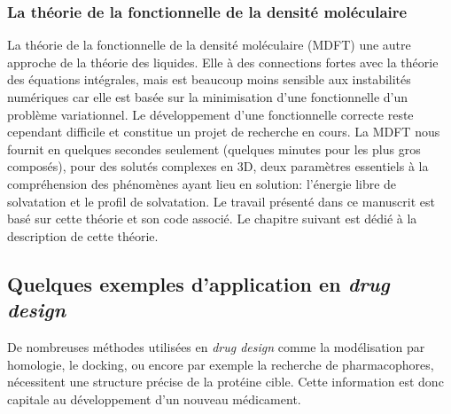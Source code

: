 \subsubsection{La théorie de la fonctionnelle de la densité moléculaire}
La théorie de la fonctionnelle de la densité moléculaire\cite{jeanmairet_molecular_2013-1,jeanmairet_classical_2015,Jeanmairet_introduction_2014,jeanmairet_hydration_2014,levesque_solvation_2012} (MDFT) une autre approche de la théorie des liquides. Elle à des connections fortes avec la théorie des équations intégrales, mais est beaucoup moins sensible aux instabilités numériques car elle est basée sur la minimisation d'une fonctionnelle d'un problème variationnel. Le développement d'une fonctionnelle correcte reste cependant difficile et constitue un projet de recherche en cours. La MDFT nous fournit en quelques secondes seulement (quelques minutes pour les plus gros composés), pour des solutés complexes en 3D, deux paramètres essentiels à la compréhension des phénomènes ayant lieu en solution: l'énergie libre de solvatation et le profil de solvatation. Le travail présenté dans ce manuscrit est basé sur cette théorie et son code associé. Le chapitre suivant est dédié à la description de cette théorie.




















\subsection{Quelques exemples d'application en \textit{drug design}}
De nombreuses méthodes utilisées en \textit{drug design} comme la modélisation par homologie, le docking, ou encore par exemple la recherche de pharmacophores, nécessitent une structure précise de la protéine cible. Cette information est donc capitale au développement d'un nouveau médicament. 

